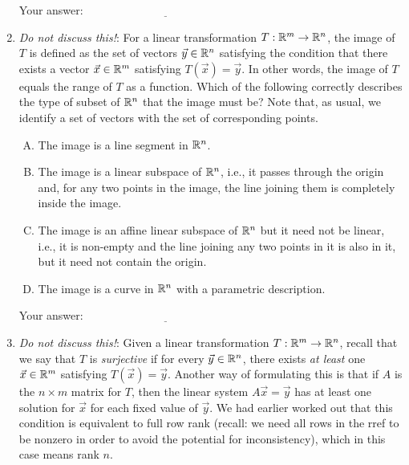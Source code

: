 \documentclass[10pt]{amsart}
\begin{document}
\begin{enumerate}
  \vspace{0.1in}
  Your answer: $\underline{\qquad\qquad\qquad\qquad\qquad\qquad\qquad}$
  \vspace{0.1in}

\item {\em Do not discuss this!}: For a linear transformation $T: \mathbb{R}^m
  \to \mathbb{R}^n$, the image of $T$ is defined as the set of vectors
  $\vec{y} \in \mathbb{R}^n$ satisfying the condition that there exists a
  vector $\vec{x} \in \mathbb{R}^m$ satisfying $T(\vec{x}) = \vec{y}$. In
  other words, the image of $T$ equals the range of $T$ as a
  function. Which of the following correctly describes the type of
  subset of $\mathbb{R}^n$ that the image must be? Note that, as usual, we
  identify a set of vectors with the set of corresponding points.
 
  \begin{enumerate}[(A)]
  \item The image is a line segment in $\mathbb{R}^n$.
  \item The image is a linear subspace of $\mathbb{R}^n$, i.e., it passes
    through the origin and, for any two points in the image, the line
    joining them is completely inside the image.
  \item The image is an affine linear subspace of $\mathbb{R}^n$ but it need
    not be linear, i.e., it is non-empty and the line joining any two
    points in it is also in it, but it need not contain the origin.
  \item The image is a curve in $\mathbb{R}^n$ with a parametric description.
  \end{enumerate}

  \vspace{0.1in}
  Your answer: $\underline{\qquad\qquad\qquad\qquad\qquad\qquad\qquad}$
  \vspace{0.1in}

\item {\em Do not discuss this!}: Given a linear transformation
  $T:\mathbb{R}^m \to \mathbb{R}^n$, recall that we say that $T$ is {\em surjective} if
  for every $\vec{y} \in \mathbb{R}^n$, there exists {\em at least} one
  $\vec{x} \in \mathbb{R}^m$ satisfying $T(\vec{x}) = \vec{y}$. Another way of
  formulating this is that if $A$ is the $n \times m$ matrix for $T$,
  then the linear system $A\vec{x} = \vec{y}$ has at least one solution
  for $\vec{x}$ for each fixed value of $\vec{y}$. We had earlier
  worked out that this condition is equivalent to full row rank
  (recall: we need all rows in the rref to be nonzero in order to
  avoid the potential for inconsistency), which in this case means
  rank $n$.


\end{enumerate}
\end{document}
